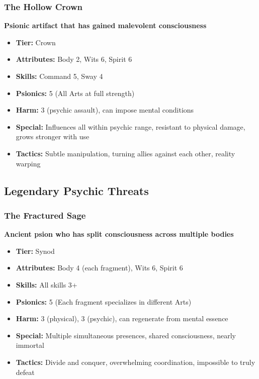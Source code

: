 \documentclass[11pt,twoside]{article}
\begin{document}
\subsubsection{The Hollow Crown}
\textbf{Psionic artifact that has gained malevolent consciousness}
\begin{itemize}[leftmargin=*]
    \item \textbf{Tier:} Crown
    \item \textbf{Attributes:} Body 2, Wits 6, Spirit 6
    \item \textbf{Skills:} Command 5, Sway 4
    \item \textbf{Psionics:} 5 (All Arts at full strength)
    \item \textbf{Harm:} 3 (psychic assault), can impose mental conditions
    \item \textbf{Special:} Influences all within psychic range, resistant to physical damage, grows stronger with use
    \item \textbf{Tactics:} Subtle manipulation, turning allies against each other, reality warping
\end{itemize}

\subsection{Legendary Psychic Threats}

\subsubsection{The Fractured Sage}
\textbf{Ancient psion who has split consciousness across multiple bodies}
\begin{itemize}[leftmargin=*]
    \item \textbf{Tier:} Synod
    \item \textbf{Attributes:} Body 4 (each fragment), Wits 6, Spirit 6
    \item \textbf{Skills:} All skills 3+
    \item \textbf{Psionics:} 5 (Each fragment specializes in different Arts)
    \item \textbf{Harm:} 3 (physical), 3 (psychic), can regenerate from mental essence
    \item \textbf{Special:} Multiple simultaneous presences, shared consciousness, nearly immortal
    \item \textbf{Tactics:} Divide and conquer, overwhelming coordination, impossible to truly defeat
\end{itemize}
\end{document}
